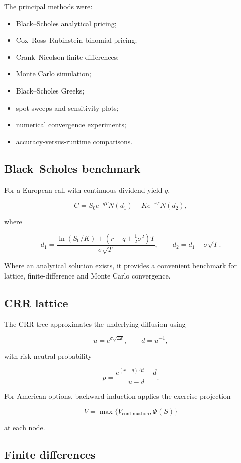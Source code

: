 \documentclass[11pt,a4paper]{article}
\begin{document}
The principal methods were:

\begin{itemize}[leftmargin=2em]
\item Black--Scholes analytical pricing;
\item Cox--Ross--Rubinstein binomial pricing;
\item Crank--Nicolson finite differences;
\item Monte Carlo simulation;
\item Black--Scholes Greeks;
\item spot sweeps and sensitivity plots;
\item numerical convergence experiments;
\item accuracy-versus-runtime comparisons.
\end{itemize}

\subsection{Black--Scholes benchmark}

For a European call with continuous dividend yield \(q\),

\[
C=S_0e^{-qT}N(d_1)-Ke^{-rT}N(d_2),
\]

where

\[
d_1=\frac{\ln(S_0/K)+(r-q+\tfrac12\sigma^2)T}{\sigma\sqrt{T}},
\qquad
 d_2=d_1-\sigma\sqrt{T}.
\]

Where an analytical solution exists, it provides a convenient benchmark for lattice, finite-difference and Monte Carlo convergence.

\subsection{CRR lattice}

The CRR tree approximates the underlying diffusion using

\[
u=e^{\sigma\sqrt{\Delta t}},\qquad d=u^{-1},
\]

with risk-neutral probability

\[
p=\frac{e^{(r-q)\Delta t}-d}{u-d}.
\]

For American options, backward induction applies the exercise projection

\[
V=\max\{V_{\text{continuation}},\Phi(S)\}
\]

at each node.

\subsection{Finite differences}
\end{document}

